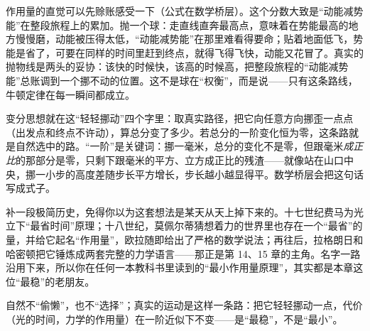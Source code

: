 \begin{mainline}
作用量的直觉可以先赊账感受一下（公式在数学桥层）。这个分数大致是“动能减势能”在整段旅程上的累加。抛一个球：走直线直奔最高点，意味着在势能最高的地方慢慢磨，动能被压得太低，“动能减势能”在那里难看得要命；贴着地面低飞，势能是省了，可要在同样的时间里赶到终点，就得飞得飞快，动能又花冒了。真实的抛物线是两头的妥协：该快的时候快，该高的时候高，把整段旅程的“动能减势能”总账调到一个挪不动的位置。这不是球在“权衡”，而是说——只有这条路线，牛顿定律在每一瞬间都成立。
\end{mainline}

\begin{center}
\end{center}

变分思想就在这“轻轻挪动”四个字里：取真实路径，把它向任意方向挪歪一点点（出发点和终点不许动），算总分变了多少。若总分的一阶变化恒为零，这条路就是自然选中的路。“一阶”是关键词：挪一毫米，总分的变化不是零，但跟毫米\emph{成正比}的那部分是零，只剩下跟毫米的平方、立方成正比的残渣——就像站在山口中央，挪一小步的高度差随步长平方增长，步长越小越显得平。数学桥层会把这句话写成式子。

补一段极简历史，免得你以为这套想法是某天从天上掉下来的。十七世纪费马为光立下“最省时间”原理；十八世纪，莫佩尔蒂猜想着力的世界里也存在一个“最省”的量，并给它起名“作用量”，欧拉随即给出了严格的数学说法；再往后，拉格朗日和哈密顿把它锤炼成两套完整的力学语言——那正是第 14、15 章的主角。名字一路沿用下来，所以你在任何一本教科书里读到的“最小作用量原理”，其实都是本章这位“最稳”的老朋友。


\begin{oneline}
自然不“偷懒”，也不“选择”；真实的运动是这样一条路：把它轻轻挪动一点，代价（光的时间，力学的作用量）在一阶近似下不变——是“最稳”，不是“最小”。
\end{oneline}


